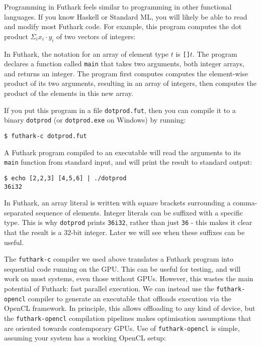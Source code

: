 \documentclass[11pt]{book}
\begin{document}
Programming in Futhark feels similar to programming in other
functional languages.  If you know Haskell or Standard ML, you will
likely be able to read and modify most Futhark code.  For example,
this program computes the dot product $\Sigma_{i} x_{i}\cdot{}y_{i}$
of two vectors of integers:



In Futhark, the notation for an array of element type $t$ is
\texttt{[]$t$}.  The program declares a function called \texttt{main}
that takes two arguments, both integer arrays, and returns an integer.
The program first computes computes the element-wise product of its
two arguments, resulting in an array of integers, then computes the
product of the elements in this new array.

If you put this program in a file \texttt{dotprod.fut}, then you can
compile it to a binary \texttt{dotprod} (or \texttt{dotprod.exe} on
Windows) by running:

\begin{verbatim}
$ futhark-c dotprod.fut
\end{verbatim}

A Futhark program compiled to an executable will read the arguments to
its \texttt{main} function from standard input, and will print the
result to standard output:

\begin{verbatim}
$ echo [2,2,3] [4,5,6] | ./dotprod
36i32
\end{verbatim}

In Futhark, an array literal is written with square brackets
surrounding a comma-separated sequence of elements.  Integer literals
can be suffixed with a specific type.  This is why \texttt{dotprod}
prints \texttt{36i32}, rather than just \texttt{36} - this makes it
clear that the result is a 32-bit integer.  Later we will see when
these suffixes can be useful.

The \texttt{futhark-c} compiler we used above translates a Futhark
program into sequential code running on the GPU.  This can be useful
for testing, and will work on most systems, even those without GPUs.
However, this wastes the main potential of Futhark: fast parallel
execution.  We can instead use the \texttt{futhark-opencl} compiler to
generate an executable that offloads execution via the OpenCL
framework.  In principle, this allows offloading to any kind of
device, but the \texttt{futhark-opencl} compilation pipelines makes
optimisation assumptions that are oriented towards contemporary GPUs.
Use of \texttt{futhark-opencl} is simple, assuming your system has a
working OpenCL setup:
\end{document}
